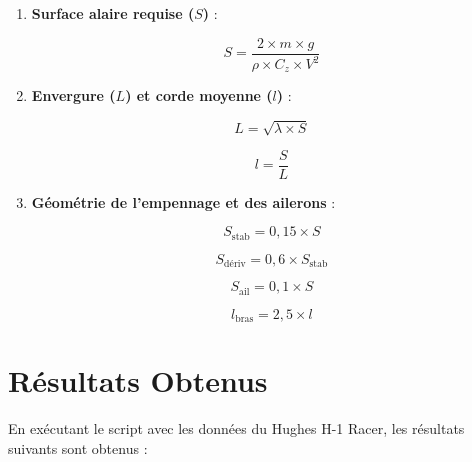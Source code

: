 \documentclass[12pt,a4paper]{article}
\begin{document}
\begin{enumerate}[label=\arabic*.]
    \item \textbf{Surface alaire requise ($S$)} :
    
    \begin{equation}
    S = \dfrac{2 \times m \times g}{\rho \times C_z \times V^2}
    \end{equation}
    
    \item \textbf{Envergure ($L$) et corde moyenne ($l$)} :
    
    \begin{equation}
    L = \sqrt{\lambda \times S}
    \end{equation}
    
    \begin{equation}
    l = \dfrac{S}{L}
    \end{equation}
    
    \item \textbf{Géométrie de l'empennage et des ailerons} :
    
    \begin{equation}
    S_{\text{stab}} = 0{,}15 \times S
    \end{equation}
    
    \begin{equation}
    S_{\text{dériv}} = 0{,}6 \times S_{\text{stab}}
    \end{equation}
    
    \begin{equation}
    S_{\text{ail}} = 0{,}1 \times S
    \end{equation}
    
    \begin{equation}
    l_{\text{bras}} = 2{,}5 \times l
    \end{equation}
\end{enumerate}

\section{Résultats Obtenus}

En exécutant le script avec les données du Hughes H-1 Racer, les résultats suivants sont obtenus :
\end{document}
